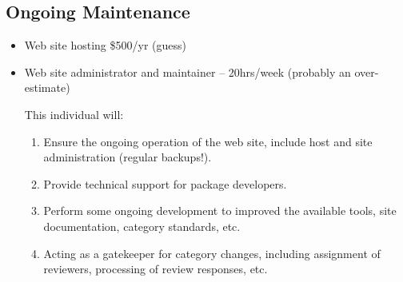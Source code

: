 \documentclass[12pt]{article}
\begin{document}
\subsection{Ongoing Maintenance}

\begin{itemize}

\item Web site hosting \$500/yr  (guess)

\item Web site administrator and maintainer -- 20hrs/week (probably an
  over-estimate)

  This individual will:

  \begin{enumerate}

  \item Ensure the ongoing operation of the web site, include host and
    site administration (regular backups!).

  \item Provide technical support for package developers.

  \item Perform some ongoing development to improved the available
    tools, site documentation, category standards, etc.

  \item Acting as a gatekeeper for category changes, including
    assignment of reviewers, processing of review responses, etc.

  \end{enumerate}

\end{itemize}
\end{document}
